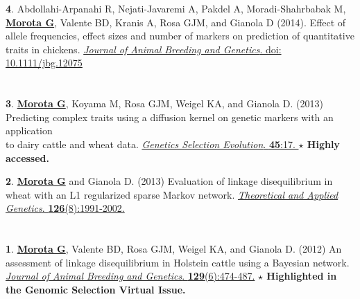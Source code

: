 \documentclass[margin,line,10pt]{res}
\newenvironment{list1}{
  \begin{list}{\ding{113}}{%
      \setlength{\itemsep}{0in}
      \setlength{\parsep}{0in} \setlength{\parskip}{0in}
      \setlength{\topsep}{0in} \setlength{\partopsep}{0in} 
      \setlength{\leftmargin}{0.17in}}}{\end{list}}
\begin{document}
\begin{resume}
\begin{list1}
\vspace{0.5cm}

\item [{\bf 4}.]  Abdollahi-Arpanahi R,  Nejati-Javaremi A,  Pakdel A, Moradi-Shahrbabak M, 
     {\bf \underline{Morota G}}, Valente BD, Kranis A, Rosa GJM, and Gianola D (2014).   
     Effect of allele frequencies, effect sizes and number of markers on prediction of quantitative 
     traits in chickens. \textcolor{blue}{\href{http://onlinelibrary.wiley.com/doi/10.1111/jbg.12075/abstract}{ {\it Journal of Animal Breeding and Genetics}. doi: 10.1111/jbg.12075} }
\end{list1}

\section{}


\begin{list1}
\item [{\bf 3}.]  {\bf \underline{Morota G}}, Koyama M, Rosa GJM, Weigel KA, and Gianola D. (2013)  \\
     Predicting complex traits using a diffusion kernel on genetic markers with an application \\ 
    to dairy cattle and wheat data. \textcolor{blue}{\href{http://www.gsejournal.org/content/45/1/17/abstract}{ {\it Genetics Selection Evolution}. {\bf 45}:17.  }} {\bf $\star$ Highly accessed.}

\vspace{0.5cm}

\item [{\bf 2}.] {\bf \underline{Morota G}} and Gianola D. (2013)  Evaluation of linkage disequilibrium in wheat with an L1 regularized sparse 
     Markov network. \textcolor{blue}{\href{http://link.springer.com/article/10.1007/s00122-013-2112-y}{ {\it Theoretical and Applied Genetics}. 
{\bf 126}(8):1991-2002.}}  
\end{list1}


\section{}
\begin{list1} 
\item [{\bf 1}.] {\bf \underline{Morota G}}, Valente BD, Rosa GJM, Weigel KA, and Gianola D. (2012)  
An assessment of linkage disequilibrium in Holstein cattle using a Bayesian network. 
 \textcolor{blue}{\href{http://onlinelibrary.wiley.com/doi/10.1111/jbg.12002/abstract}{ {\it Journal of Animal Breeding and Genetics}. {\bf 129}(6):474-487.} } 
{\bf $\star$ Highlighted in the Genomic Selection Virtual Issue.}
\end{list1}




\end{resume}
\end{document}
